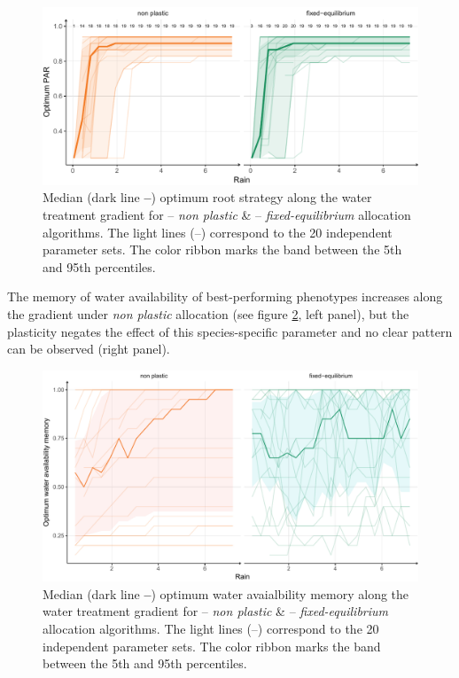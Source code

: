 \begin{figure}\label{fig:gradient_strat_trend}
\includegraphics[width = \textwidth]{./2_PP/Figures/Rain/gradient_strat_trend.pdf}
\caption{Median (dark line \textbf{--}) optimum root strategy along the water treatment gradient for \textcolor{myOrange}{-- \textit{non plastic}} \&  \textcolor{myGreen}{-- \textit{fixed-equilibrium}} allocation algorithms. The light lines (--) correspond to the 20 independent parameter sets. The color ribbon marks the band between the 5th and 95th percentiles.} %
\end{figure}

The memory of water availability of best-performing phenotypes increases along the gradient under \textit{non plastic} allocation (see figure \ref{fig:gradient_w_ini_trend}, left panel), but the plasticity negates the effect of this species-specific parameter and no clear pattern can be observed (right panel).


\begin{figure}\label{fig:gradient_w_ini_trend}
\includegraphics[width = \textwidth]{./2_PP/Figures/Rain/best_w_ini_pl_rain_grad_alt.pdf}
\caption{Median (dark line \textbf{--}) optimum water avaialbility memory along the water treatment gradient for \textcolor{myOrange}{-- \textit{non plastic}} \&  \textcolor{myGreen}{-- \textit{fixed-equilibrium}} allocation algorithms. The light lines (--) correspond to the 20 independent parameter sets. The color ribbon marks the band between the 5th and 95th percentiles.} %
\end{figure}


